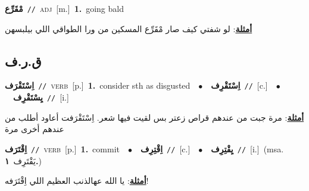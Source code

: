 \documentclass[10pt,a4paper,twoside]{article} %
\begin{document}
\begin{multicols}{2}
{\setlength\topsep{0pt}\textbf{\foreignlanguage{arabic}{مْقَرِّع}}\ {\color{gray}\texttt{//}\color{black}}\ \textsc{adj}\ [m.]\ \textbf{1.}~going bald\  \begin{flushright}\color{gray}\foreignlanguage{arabic}{\textbf{\underline{\foreignlanguage{arabic}{أمثلة}}}: لو شفتي كيف صار مْقَرِّع المسكين من ورا الطواقي اللي بيلبسهن}\end{flushright}\color{black}} \vspace{2mm}

\vspace{-3mm}
\subsection*{\color{blue}\foreignlanguage{arabic}{ق.ر.ف}\color{blue}{}} 

{\setlength\topsep{0pt}\textbf{\foreignlanguage{arabic}{اِسْتَقْرَف}}\ {\color{gray}\texttt{//}\color{black}}\ \textsc{verb}\ [p.]\ \textbf{1.}~consider sth as disgusted\ \ $\bullet$\ \ \setlength\topsep{0pt}\textbf{\foreignlanguage{arabic}{اِسْتَقْرِف}}\ {\color{gray}\texttt{//}\color{black}}\ [c.]\ \ $\bullet$\ \ \setlength\topsep{0pt}\textbf{\foreignlanguage{arabic}{يِسْتَقْرِف}}\ {\color{gray}\texttt{//}\color{black}}\ [i.]\  \begin{flushright}\color{gray}\foreignlanguage{arabic}{\textbf{\underline{\foreignlanguage{arabic}{أمثلة}}}: مرة جبت من عندهم قراص زعتر بس لقيت فيها شعر. اِسْتَقْرَفت أعاود أطلب من عندهم أخرى مرة}\end{flushright}\color{black}} \vspace{2mm}

{\setlength\topsep{0pt}\textbf{\foreignlanguage{arabic}{اِقْتَرَف}}\ {\color{gray}\texttt{//}\color{black}}\ \textsc{verb}\ [p.]\ \textbf{1.}~commit\ \ $\bullet$\ \ \setlength\topsep{0pt}\textbf{\foreignlanguage{arabic}{اِقْتِرِف}}\ {\color{gray}\texttt{//}\color{black}}\ [c.]\ \ $\bullet$\ \ \setlength\topsep{0pt}\textbf{\foreignlanguage{arabic}{يِقْتِرِف}}\ {\color{gray}\texttt{//}\color{black}}\ [i.]\ \color{gray}(msa. \foreignlanguage{arabic}{يَقْتَرِف}~\foreignlanguage{arabic}{\textbf{١.}})\color{black}\  \begin{flushright}\color{gray}\foreignlanguage{arabic}{\textbf{\underline{\foreignlanguage{arabic}{أمثلة}}}: يا الله عهالذنب العظيم اللي اِقْتَرَفه!}\end{flushright}\color{black}} \vspace{2mm}


\end{multicols}
\end{document}
